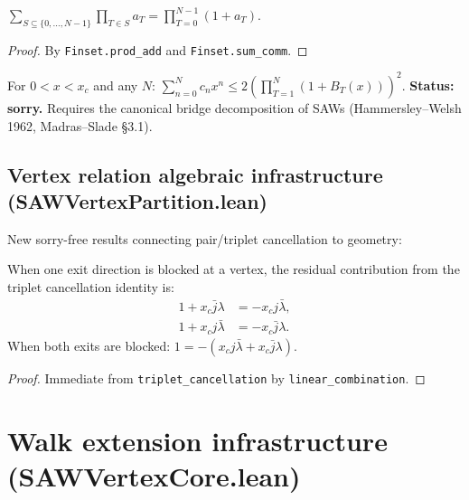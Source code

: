 \begin{lemma}
\begin{lemma}\label{lem:prod_powerset}
\leanok
  $\displaystyle\sum_{S \subseteq \{0,\ldots,N-1\}} \prod_{T \in S} a_T
    = \prod_{T=0}^{N-1} (1 + a_T)$.
\end{lemma}
\begin{proof}\leanok
  By \texttt{Finset.prod\_add} and \texttt{Finset.sum\_comm}.
\end{proof}

\begin{theorem}\label{thm:hw_counting}
  For $0 < x < x_c$ and any $N$:
  $\sum_{n=0}^{N} c_n x^n \leq 2 \left(\prod_{T=1}^{N} (1 + B_T(x))\right)^2.$
  \textbf{Status: sorry.} Requires the canonical bridge decomposition of SAWs
  (Hammersley--Welsh 1962, Madras--Slade \S3.1).
\end{theorem}

\subsection*{Vertex relation algebraic infrastructure (SAWVertexPartition.lean)}

New sorry-free results connecting pair/triplet cancellation to geometry:

\begin{lemma}\label{lem:pair_residual}
\leanok
{}
  When one exit direction is blocked at a vertex, the residual contribution
  from the triplet cancellation identity is:
  \begin{align*}
    1 + x_c \bar{j} \lambda &= -x_c j \bar{\lambda}, \\
    1 + x_c j \bar{\lambda} &= -x_c \bar{j} \lambda.
  \end{align*}
  When both exits are blocked:
  $1 = -(x_c j \bar{\lambda} + x_c \bar{j} \lambda)$.
\end{lemma}
\begin{proof}\leanok
  Immediate from \texttt{triplet\_cancellation} by \texttt{linear\_combination}.
\end{proof}

\section{Walk extension infrastructure (SAWVertexCore.lean)}


\end{lemma}
